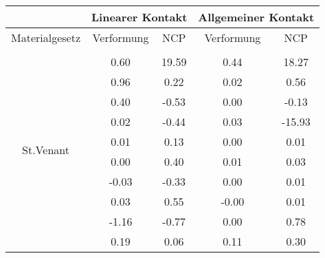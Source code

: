 \begin{table} 
\centering 
\begin{tabular}{c|cc|cc|} 
\cline{2-5} 
 & \multicolumn{2}{|c|}{Linearer Kontakt} & \multicolumn{2}{|c|}{Allgemeiner Kontakt} \\ 
\hline 
\multicolumn{1}{|c|}{Materialgesetz} & \multicolumn{1}{c|}{Verformung} & \multicolumn{1}{c|}{NCP} & \multicolumn{1}{c|}{Verformung} & \multicolumn{1}{c|}{NCP} \\ 
\hline 
\multicolumn{1}{|c|}{\multirow{53}{*}{St.Venant}} &\multicolumn{1}{|c|}{} & \multicolumn{1}{|c|}{} & \multicolumn{1}{|c|}{} & \multicolumn{1}{|c|}{} \\ 
\multicolumn{1}{|c|}{} & \multicolumn{1}{|c|}{      0.60} & \multicolumn{1}{|c|}{     19.59} & \multicolumn{1}{|c|}{      0.44} & \multicolumn{1}{|c|}{     18.27} \\ 
\multicolumn{1}{|c|}{} & \multicolumn{1}{|c|}{      0.96} & \multicolumn{1}{|c|}{      0.22} & \multicolumn{1}{|c|}{      0.02} & \multicolumn{1}{|c|}{      0.56} \\ 
\multicolumn{1}{|c|}{} & \multicolumn{1}{|c|}{      0.40} & \multicolumn{1}{|c|}{     -0.53} & \multicolumn{1}{|c|}{      0.00} & \multicolumn{1}{|c|}{     -0.13} \\ 
\multicolumn{1}{|c|}{} & \multicolumn{1}{|c|}{      0.02} & \multicolumn{1}{|c|}{     -0.44} & \multicolumn{1}{|c|}{      0.03} & \multicolumn{1}{|c|}{    -15.93} \\ 
\multicolumn{1}{|c|}{} & \multicolumn{1}{|c|}{      0.01} & \multicolumn{1}{|c|}{      0.13} & \multicolumn{1}{|c|}{      0.00} & \multicolumn{1}{|c|}{      0.01} \\ 
\multicolumn{1}{|c|}{} & \multicolumn{1}{|c|}{      0.00} & \multicolumn{1}{|c|}{      0.40} & \multicolumn{1}{|c|}{      0.01} & \multicolumn{1}{|c|}{      0.03} \\ 
\multicolumn{1}{|c|}{} & \multicolumn{1}{|c|}{     -0.03} & \multicolumn{1}{|c|}{     -0.33} & \multicolumn{1}{|c|}{      0.00} & \multicolumn{1}{|c|}{      0.01} \\ 
\multicolumn{1}{|c|}{} & \multicolumn{1}{|c|}{      0.03} & \multicolumn{1}{|c|}{      0.55} & \multicolumn{1}{|c|}{     -0.00} & \multicolumn{1}{|c|}{      0.01} \\ 
\multicolumn{1}{|c|}{} & \multicolumn{1}{|c|}{     -1.16} & \multicolumn{1}{|c|}{     -0.77} & \multicolumn{1}{|c|}{      0.00} & \multicolumn{1}{|c|}{      0.78} \\ 
\multicolumn{1}{|c|}{} & \multicolumn{1}{|c|}{      0.19} & \multicolumn{1}{|c|}{      0.06} & \multicolumn{1}{|c|}{      0.11} & \multicolumn{1}{|c|}{      0.30} \\ 

\end{tabular}
\end{table}
